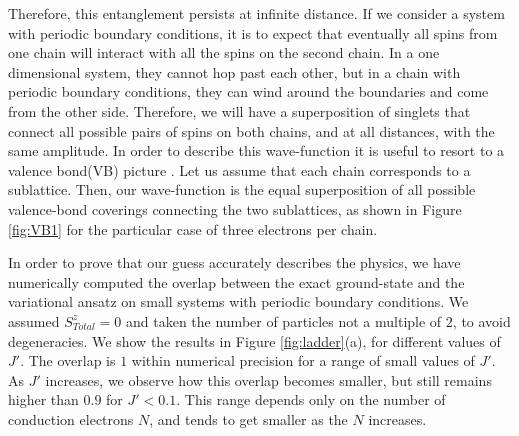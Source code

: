 \documentclass[article,11pt]{revtex4}
\begin{document}
Therefore, this entanglement persists at infinite distance. If we consider a system with periodic boundary conditions, it is to expect that eventually all spins from one chain will interact with all the spins on the second chain. In a one dimensional system, they cannot hop past each other, but in a chain with periodic boundary conditions, they can wind around the boundaries and come from the other side. Therefore, we will have a superposition of singlets that connect all possible pairs of spins on both chains, and at all distances, with the same amplitude. In order to describe this wave-function it is useful to resort to a valence bond(VB) picture \cite{Pauling1933,Oguchi1989,Beach2006,Tang2011}. Let us assume that each chain corresponds to a sublattice. Then, our wave-function is the equal superposition of all possible valence-bond coverings connecting the two sublattices, as shown in Figure \ref{fig:VB1} for the particular case of three electrons per chain.

In order to prove that our guess accurately describes the physics, we have numerically computed the overlap between the exact ground-state and the variational ansatz on small systems with periodic boundary conditions. We assumed $S^z_{Total}=0$ and taken the number of particles not a multiple of $2$, to avoid degeneracies. We show the results in Figure \ref{fig:ladder}(a), for different values of $J'$. The overlap is $1$ within numerical precision for a range of small values of $J'$. As $J'$ increases, we observe how this overlap becomes smaller, but still remains higher than $0.9$ for $J' < 0.1$. This range depends only on the number of conduction electrons $N$, and tends to get smaller as the $N$ increases. 
\end{document}
